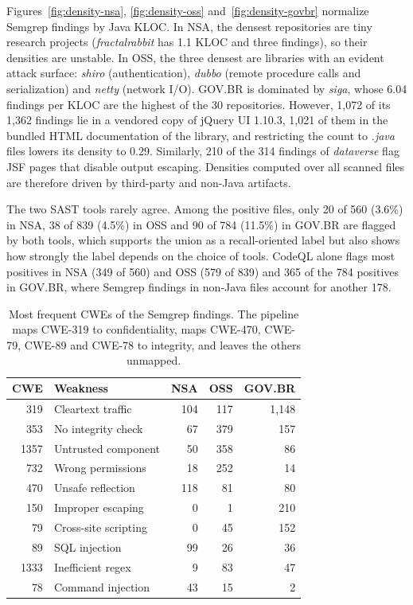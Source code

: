 \documentclass[a4paper,twoside]{article}
\begin{document}
Figures~\ref{fig:density-nsa}, \ref{fig:density-oss} and~\ref{fig:density-govbr} normalize Semgrep findings by Java KLOC. In NSA, the densest repositories are tiny research projects (\textit{fractalrabbit} has 1.1 KLOC and three findings), so their densities are unstable. In OSS, the three densest are libraries with an evident attack surface: \textit{shiro} (authentication), \textit{dubbo} (remote procedure calls and serialization) and \textit{netty} (network I/O). GOV.BR is dominated by \textit{siga}, whose 6.04 findings per KLOC are the highest of the 30 repositories. However, 1,072 of its 1,362 findings lie in a vendored copy of jQuery UI 1.10.3, 1,021 of them in the bundled HTML documentation of the library, and restricting the count to \textit{.java} files lowers its density to 0.29. Similarly, 210 of the 314 findings of \textit{dataverse} flag JSF pages that disable output escaping. Densities computed over all scanned files are therefore driven by third-party and non-Java artifacts.

The two SAST tools rarely agree. Among the positive files, only 20 of 560 (3.6\%) in NSA, 38 of 839 (4.5\%) in OSS and 90 of 784 (11.5\%) in GOV.BR are flagged by both tools, which supports the union as a recall-oriented label but also shows how strongly the label depends on the choice of tools. CodeQL alone flags most positives in NSA (349 of 560) and OSS (579 of 839) and 365 of the 784 positives in GOV.BR, where Semgrep findings in non-Java files account for another 178.

\begin{table}[t]
\caption{Most frequent CWEs of the Semgrep findings. The pipeline maps CWE-319 to confidentiality, maps CWE-470, CWE-79, CWE-89 and CWE-78 to integrity, and leaves the others unmapped.}\label{tab:cwe}
\centering
\footnotesize
\setlength{\tabcolsep}{4pt}
\begin{tabular}{@{}rlrrr@{}}
\toprule
CWE & Weakness & NSA & OSS & GOV.BR \\
\midrule
319 & Cleartext traffic & 104 & 117 & 1,148 \\
353 & No integrity check & 67 & 379 & 157 \\
1357 & Untrusted component & 50 & 358 & 86 \\
732 & Wrong permissions & 18 & 252 & 14 \\
470 & Unsafe reflection & 118 & 81 & 80 \\
150 & Improper escaping & 0 & 1 & 210 \\
79 & Cross-site scripting & 0 & 45 & 152 \\
89 & SQL injection & 99 & 26 & 36 \\
1333 & Inefficient regex & 9 & 83 & 47 \\
78 & Command injection & 43 & 15 & 2 \\
\bottomrule
\end{tabular}
\end{table}
\end{document}
